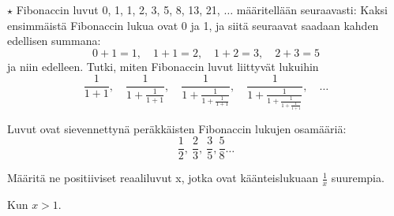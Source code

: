 \begin{tehtavasivu}
\begin{tehtava}
	$\star$ Fibonaccin luvut 0, 1, 1, 2, 3, 5, 8, 13, 21, $\ldots$ määritellään seuraavasti: Kaksi ensimmäistä
	Fibonaccin lukua ovat 0 ja 1, ja siitä seuraavat saadaan kahden
	edellisen summana: \[ 0+1=1, \quad 1+1=2, \quad 1+2 = 3, \quad 2+3=5 \] 
	ja niin edelleen. 
	Tutki, miten Fibonaccin luvut liittyvät lukuihin
	\[ \frac{1}{1+1}, \quad \frac{1}{1+\frac{1}{1+1}}, \quad
	\frac{1}{1+\frac{1}{1+\frac{1}{1+1}}}, \quad 
	\frac{1}{1+\frac{1}{1+\frac{1}{1+\frac{1}{1+1}}}}, \quad \ldots\]
	\begin{vastaus}
		Luvut ovat sievennettynä peräkkäisten Fibonaccin
		lukujen osamääriä:
		\[\frac{1}{2}, \ \frac{2}{3}, \ \frac{3}{5}, \frac{5}{8} \ldots  \]
	\end{vastaus}
\end{tehtava}

\begin{tehtava}
	\begin{alakohdat}
	\end{alakohdat}
	\begin{vastaus}
		\begin{alakohdat}
			\alakohta{$\frac{1}{n(n+1)}$}
			\alakohta{$1-\frac{1}{n}$}
		\end{alakohdat}
	\end{vastaus}
\end{tehtava}

\begin{tehtava}
	Määritä ne positiiviset reaaliluvut x, jotka ovat käänteislukuaan $\frac{1}{x}$ suurempia.
	\begin{vastaus}
	 Kun $x>1$.
	\end{vastaus}
\end{tehtava}


\end{tehtavasivu}
